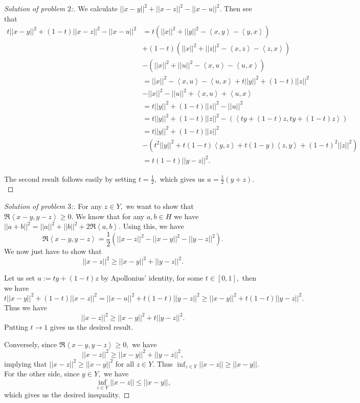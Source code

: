 \documentclass[letterpaper,11pt,twoside]{article}
\theoremstyle{proposition}
\theoremstyle{definition}
\theoremstyle{theorem}
\theoremstyle{definition}
\theoremstyle{definition}
\theoremstyle{definition}
\theoremstyle{lemma}
\theoremstyle{definition}
\theoremstyle{definition}
\theoremstyle{corollary}
\theoremstyle{definition}
\theoremstyle{definition}
\theoremstyle{definition}
\newcommand{\abs}[1]{\left \vert #1 \right \vert}
\newcommand{\norm}[1]{\left \vert \left \vert #1 \right \vert \right \vert}
\newcommand{\gen}[1]{\left\langle #1\right\rangle}
\begin{document}
\begin{proof}[Solution of problem $2$:]
	We calculate $\abs{\abs{x-y}}^2 + \abs{\abs{x-z}}^2- \abs{\abs{x-u}}^2.$ Then see that 
	\begin{align*}
		t\abs{\abs{x-y}}^2 + (1-t)\abs{\abs{x-z}}^2- \abs{\abs{x-u}}^2&= t(\norm{x}^2 + \norm{y}^2 - \gen{x,y}- \gen{y,x} )\\
		&+ (1-t)(\norm{x}^2 + \norm{z}^2 - \gen{x,z}- \gen{z,x} )\\
		&- (\norm{x}^2 + \norm{u}^2 - \gen{x,u}- \gen{u,x} ) \\
		&= \norm{x}^2 - \gen{x,u} - \gen{u,x} + t \norm{y}^2 + (1-t)\norm{z}^2\\
		&- \norm{x}^2- \norm{u}^2 + \gen{x,u} + \gen{u,x} \\
		&= t \norm{y}^2 + (1-t)\norm{z}^2- \norm{u}^2\\
		&= t \norm{y}^2 + (1-t)\norm{z}^2 - \left(\gen{ty+ (1-t)z,ty+ (1-t)z} \right)\\
		&= t \norm{y}^2 + (1-t)\norm{z}^2\\ 
		&- \left( t^2 \norm{y}^2 + t(1-t) \gen{y,z} + t(1-y) \gen{z,y} + (1-t)^2 \norm{z}^2 \right)\\
		&= t(1-t) \norm{y-z}^2.
	\end{align*}
	
	The second result follows easily by setting $t= \frac{1}{2},$ which gives us $u =\frac{1}{2}(y+z).$
\end{proof}
\begin{proof}[Solution of problem $3$:]
	For any $z \in Y,$ we want to show that $\Re \gen{x-y,y-z} \geq 0.$
	We know that for any $a,b \in H$ we have $\norm{a+b}^2 = \norm{a}^2+\norm{b}^2 + 2 \Re\gen{a,b}.$
	Using this, we have $$\Re \gen{x-y,y-z}  = \frac{1}{2} \left(\norm{x-z}^2-\norm{x-y}^2- \norm{y-z}^2\right). $$
	We now just have to show that $$ \norm{x-z}^2 \geq \norm{x-y}^2+ \norm{y-z}^2.$$ 
	
	Let us set $u:= ty+(1-t)z$ by Apollonius' identity, for some $t \in [0,1],$ then we have
	$$ t\norm{x-y}^2 + (1-t)\norm{x-z}^2 = \norm{x-u}^2 + t(1-t)\norm{y-z}^2 \geq \norm{x-y}^2 + t(1-t)\norm{y-z}^2.$$
	Thus we have $$\norm{x-z}^2 \geq \norm{x-y}^2 + t\norm{y-z}^2.$$ Putting $t \to 1$ gives us the desired result.
	
	Conversely, since $\Re \gen{x-y,y-z} \geq 0,$ we have  $$\norm{x-z}^2 \geq \norm{x-y}^2 + \norm{y-z}^2,$$ implying that $\norm{x-z}^2 \geq \norm{x-y}^2$
	for all $z \in Y.$ Thus $\inf_{z \in Y} \norm{x-z} \geq \norm{x-y}.$ For the other side, since $y \in Y,$ we have 
	$$\inf_{z \in Y} \norm{x-z} \leq \norm{x-y},$$ which gives us the desired inequality. 
	

\end{proof}
\end{document}
